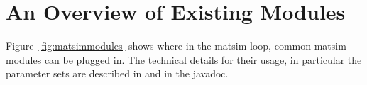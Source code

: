 %




\section{An Overview of Existing Modules}
Figure~\ref{fig:matsimmodules} shows where in the \gls{matsim} loop, common \gls{matsim} modules can be plugged in. The technical details for their usage, in particular the parameter sets are described in \citep[][]{MATSim_Userguide_2014} and in the javadoc.

